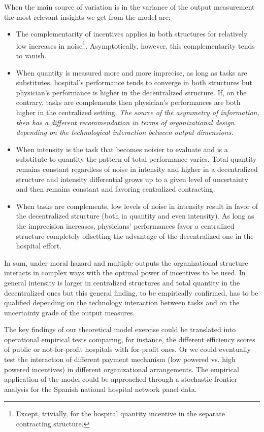 \documentclass[12pt,letterpaper]{article}
\begin{document}
When the main source of variation is in the variance of the output measurement the most relevant insights we get from the model are:
\begin{itemize}
  \item The complementarity of incentives applies in both structures for relatively low increases in noise\footnote{Except, trivially, for the hospital quantity incentive in the separate contracting structure.}. Asymptotically, however, this complementarity tends to vanish.
  \item When quantity is measured more and more imprecise, as long as tasks are substitutes, hospital's performance tends to converge in both structures but physician's performance is higher in the decentralized structure. If, on the contrary, tasks are complements then physician's performances are both higher in the centralized setting. \emph{The source of the asymmetry of information, then has a different recommendation in terms of organizational design depending on the technological interaction between output dimensions.}
  \item When intensity is the task that becomes noisier to evaluate and is a substitute to quantity the pattern of total performance varies. Total quantity remains constant regardless of noise in intensity and higher in a decentralized structure and intensity differential grows up to a given level of uncertainty and then remains constant and favoring centralized contracting.
  \item When tasks are complements, low levels of noise in intensity result in favor of the decentralized structure (both in quantity and even intensity). As long as the imprecision increases, physicians' performances favor a centralized structure completely offsetting the advantage of the decentralized one in the hospital effort.
  \end{itemize}


In sum, under moral hazard and multiple outputs the organizational structure interacts in complex ways with the optimal power of incentives to be used. In general intensity is larger in centralized structures and total quantity in the decentralized ones but this general finding, to be empirically confirmed, has to be qualified depending on the technology interaction between tasks and on the uncertainty grade of the output measures.

The key findings of our theoretical model exercise could be translated into operational empirical tests comparing, for instance,  the different efficiency scores of public or not-for-profit hospitals with for-profit ones. Or we could eventually test the interaction of different payment mechanism (low powered vs. high powered incentives) in different organizational arrangements. The empirical application of the model could be approached through a stochastic frontier analysis for the Spanish national hospital network panel data.

%
%
\newpage

%



%
\end{document}
